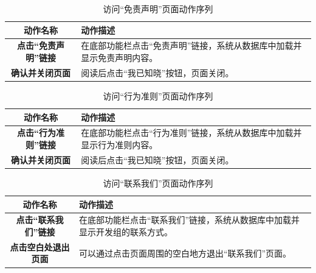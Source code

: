\begin{itemize}
	\begin{table}[H]
		\centering
		\caption{访问“免责声明”页面动作序列}
		\renewcommand\arraystretch{1.5}
		\begin{tabular}{|c|>{\raggedright\arraybackslash}p{10cm}|}
			\hline
			\textbf{动作名称} & \textbf{动作描述} \\ \hline
			\textbf{点击“免责声明”链接} & 在底部功能栏点击“免责声明”链接，系统从数据库中加载并显示免责声明内容。 \\ \hline
			\textbf{确认并关闭页面} & 阅读后点击“我已知晓”按钮，页面关闭。 \\ \hline
		\end{tabular}
	\end{table}

	\begin{table}[H]
		\centering
		\caption{访问“行为准则”页面动作序列}
		\renewcommand\arraystretch{1.5}
		\begin{tabular}{|c|>{\raggedright\arraybackslash}p{10cm}|}
			\hline
			\textbf{动作名称} & \textbf{动作描述} \\ \hline
			\textbf{点击“行为准则”链接} & 在底部功能栏点击“行为准则”链接，系统从数据库中加载并显示行为准则内容。 \\ \hline
			\textbf{确认并关闭页面} & 阅读后点击“我已知晓”按钮，页面关闭。 \\ \hline
		\end{tabular}
	\end{table}

	\begin{table}[H]
		\centering
		\caption{访问“联系我们”页面动作序列}
		\renewcommand\arraystretch{1.5}
		\begin{tabular}{|c|>{\raggedright\arraybackslash}p{10cm}|}
			\hline
			\textbf{动作名称} & \textbf{动作描述} \\ \hline
			\textbf{点击“联系我们”链接} & 在底部功能栏点击“联系我们”链接，系统从数据库中加载并显示开发组的联系方式。 \\ \hline
			\textbf{点击空白处退出页面} & 可以通过点击页面周围的空白地方退出“联系我们”页面。 \\ \hline
		\end{tabular}
	\end{table}


\end{itemize}
